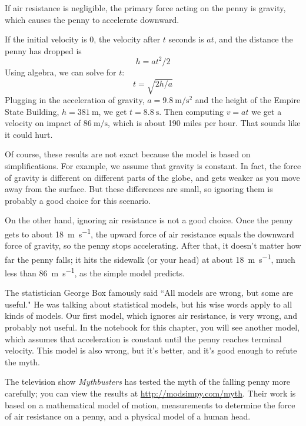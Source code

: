 \documentclass[12pt]{book}
\theoremstyle{exercise}
\begin{document}
If air resistance is negligible, the primary force acting on the penny is gravity, which causes the penny to accelerate downward.

If the initial velocity is 0, the velocity after $t$ seconds is $a t$, and the distance the penny has dropped is
%
\[ h = a t^2 / 2 \]
%
Using algebra, we can solve for $t$:
%
\[ t = \sqrt{ 2 h / a} \]
%
Plugging in the acceleration of gravity, $a = \SI{9.8}{\meter\per\second\squared}$ and the height of the Empire State Building, $h=\SI{381}{\meter}$, we get $t = \SI{8.8}{\second}$.  Then computing $v = a t$ we get a velocity on impact of $\SI{86}{\meter\per\second}$, which is about 190 miles per hour.  That sounds like it could hurt.

Of course, these results are not exact because the model is based on simplifications.  For example, we assume that gravity is constant.  In fact, the force of gravity is different on different parts of the globe, and gets weaker as you move away from the surface.  But these differences are small, so ignoring them is probably a good choice for this scenario.

On the other hand, ignoring air resistance is not a good choice.  Once the penny gets to about \SI{18}{\meter\per\second}, the upward force of air resistance equals the downward force of gravity, so the penny stops accelerating.  After that, it doesn't matter how far the penny falls; it hits the sidewalk (or your head) at about \SI{18}{\meter\per\second}, much less than \SI{86}{\meter\per\second}, as the simple model predicts.

The statistician George Box famously said ``All models are wrong, but some are useful."  He was talking about statistical models, but his wise words apply to all kinds of models.  Our first model, which ignores air resistance, is very wrong, and probably not useful.  In the notebook for this chapter, you will see another model, which assumes that acceleration is constant until the penny reaches terminal velocity.  This model is also wrong, but it's better, and it's good enough to refute the myth.


The television show {\it Mythbusters} has tested the myth of the falling penny more carefully; you can view the results at \url{http://modsimpy.com/myth}.  Their work is based on a mathematical model of motion, measurements to determine the force of air resistance on a penny, and a physical model of a human head.
\end{document}
